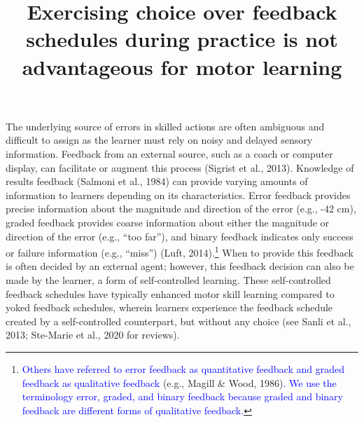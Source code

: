 \documentclass[
  man, donotrepeattitle,floatsintext]{apa7}
\title{Exercising choice over feedback schedules during practice is not advantageous for motor learning}
\author{\phantom{0}}
\date{}
\affiliation{\phantom{0}}
\begin{document}
\maketitle

The underlying source of errors in skilled actions are often ambiguous and difficult to assign as the learner must rely on noisy and delayed sensory information. Feedback from an external source, such as a coach or computer display, can facilitate or augment this process (Sigrist et al., 2013). Knowledge of results feedback (Salmoni et al., 1984) can provide varying amounts of information to learners depending on its characteristics. Error feedback provides precise information about the magnitude and direction of the error (e.g., -42 cm), graded feedback provides coarse information about either the magnitude or direction of the error (e.g., ``too far''), and binary feedback indicates only success or failure information (e.g., ``miss'') (Luft, 2014).\footnote{\textcolor{blue}{Others have referred to error feedback as quantitative feedback and graded feedback as qualitative feedback} (e.g., Magill \& Wood, 1986)\textcolor{blue}{. We use the terminology error, graded, and binary feedback because graded and binary feedback are different forms of qualitative feedback.}} When to provide this feedback is often decided by an external agent; however, this feedback decision can also be made by the learner, a form of self-controlled learning. These self-controlled feedback schedules have typically enhanced motor skill learning compared to yoked feedback schedules, wherein learners experience the feedback schedule created by a self-controlled counterpart, but without any choice (see Sanli et al., 2013; Ste-Marie et al., 2020 for reviews).
\end{document}
